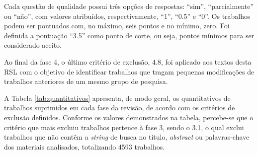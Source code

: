 \documentclass[tese,capa]{texufpel}
\begin{document}
Cada questão de qualidade possui três opções de respostas: ``sim'', ``parcialmente'' ou ``não'', com valores atribuídos, respectivamente, ``1'', ``0.5'' e ``0''. Os trabalhos podem ser pontuados com, no máximo, seis pontos e no mínimo, zero. Foi definida a pontuação ``3.5'' como ponto de corte, ou seja, pontos mínimos para ser considerado aceito.

Ao final da fase 4, o último critério de exclusão, 4.8, foi aplicado aos textos desta RSL com o objetivo de identificar trabalhos que tragam pequenas modificações de trabalhos anteriores de um mesmo grupo de pesquisa.

A Tabela \ref{tab:quantitativos} apresenta, de modo geral, os quantitativos de trabalhos suprimidos em cada fase da revisão, de acordo com os critérios de exclusão definidos. Conforme os valores demonstrados na tabela, percebe-se que o critério que mais excluiu trabalhos pertence à fase 3, sendo o 3.1, o qual exclui trabalhos que não contêm a \emph{string} de busca no título, \emph{abstract} ou palavras-chave dos materiais analisados, totalizando 4593 trabalhos.
\end{document}
